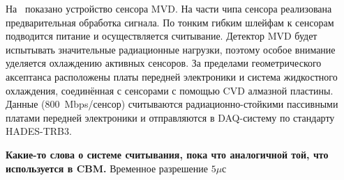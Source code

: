 

На~ показано устройство сенсора MVD.
На части чипа сенсора реализована предварительная обработка сигнала.
По тонким гибким шлейфам к сенсорам подводится питание и осуществляется считывание.
Детектор MVD будет испытывать значительные радиационные нагрузки, поэтому особое внимание уделяется охлаждению активных сенсоров. 
За пределами геометрического аксептанса расположены платы передней электроники и система жидкостного охлаждения, соединённая с сенсорами с помощью CVD алмазной пластины.
Данные (800~Mbps/сенсор) считываются радиационно-стойкими пассивными платами передней электроники и отправляются в DAQ-систему по стандарту HADES-TRB3.

\textbf{Какие-то слова о системе считывания, пока что аналогичной той, что используется в CBM.}
Временное разрешение $5 \mu$с \todo \todo \todo


